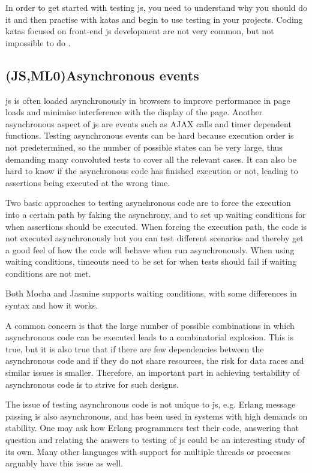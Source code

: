 \documentclass[11pt]{article}
\begin{document}
In order to get started with testing \gls{js}, you need to understand why you should do it \cite[question~38]{Edelstam} and then practise with katas and begin to use testing in your projects. Coding katas focused on front-end \gls{js} development are not very common, but not impossible to do \cite[question~47]{Ahnve}.

\subsection{(JS,ML0)Asynchronous events}
\label{subsec:asynchronous}

\gls{js} is often loaded asynchronously in browsers to improve performance in page loads and minimise interference with the display of the page. Another asynchronous aspect of \gls{js} are events such as AJAX calls and timer dependent functions. Testing asynchronous events can be hard because execution order is not predetermined, so the number of possible states can be very large, thus demanding many convoluted tests to cover all the relevant cases. It can also be hard to know if the asynchronous code has finished execution or not, leading to assertions being executed at the wrong time.

Two basic approaches to testing asynchronous code are to force the execution into a certain path by faking the asynchrony, and to set up waiting conditions for when assertions should be executed. When forcing the execution path, the code is not executed asynchronously but you can test different scenarios and thereby get a good feel of how the code will behave when run asynchronously. When using waiting conditions, timeouts need to be set for when tests should fail if waiting conditions are not met.

Both Mocha and Jasmine supports waiting conditions, with some differences in syntax and how it works.

A common concern is that the large number of possible combinations in which asynchronous code can be executed leads to a combinatorial explosion. This is true, but it is also true that if there are few dependencies between the asynchronous code and if they do not share resources, the risk for data races and similar issues is smaller. Therefore, an important part in achieving testability of asynchronous code is to strive for such designs.

The issue of testing asynchronous code is not unique to \gls{js}, e.g. Erlang message passing is also asynchronous, and has been used in systems with high demands on stability. One may ask how Erlang programmers test their code, answering that question and relating the answers to testing of \gls{js} could be an interesting study of its own. Many other languages with support for multiple threads or processes arguably have this issue as well.
\end{document}
